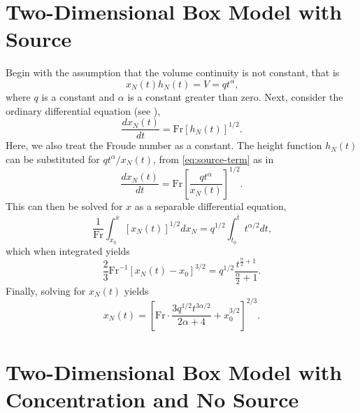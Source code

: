 	\section{Two-Dimensional Box Model with Source}
	Begin with the assumption that the volume continuity is not constant, that is 
	\begin{equation}\label{eq:source-term}
		x_N(t)h_N(t) = V = qt^{\alpha}\text{,}
	\end{equation}
	where \(q\) is a constant and \(\alpha\) is a constant greater than zero. Next, consider the ordinary differential equation (see \cite[60]{Ungarish2009}), 
	\begin{equation}\label{eq:box-model}
		\frac{dx_N(t)}{dt} = \text{Fr}\left[h_N(t)\right]^{1/2}\text{.}
	\end{equation}
	Here, we also treat the Froude number as a constant. The height function \(h_N(t)\) can be substituted for \(qt^{\alpha} / x_N(t)\), from \eqref{eq:source-term} as in
	\begin{equation*}
		\frac{dx_N(t)}{dt} = \text{Fr}\left[\frac{qt^{\alpha}}{x_N(t)}\right]^{1/2}\text{.}
	\end{equation*}
	This can then be solved for \(x\) as a separable differential equation,
	\begin{equation*}
		\frac{1}{\text{Fr}}\int_{x_0}^{\bar{x}} \left[x_N(t)\right]^{1/2} dx_N = q^{1/2} \int_{t_0}^{\bar{t}} t^{\alpha/2} dt\text{,}
	\end{equation*}
	which when integrated yields
	\begin{equation*}
		\frac{2}{3}\text{Fr}^{-1}\left[x_N(t) - x_0\right]^{3/2} = q^{1/2}\frac{t^{\frac{\alpha}{2} +1}}{\frac{\alpha}{2} + 1}\text{.}
	\end{equation*}
	Finally, solving for \(x_N(t)\) yields
	\begin{equation*}
		x_N(t) = \left[\text{Fr}\cdot\frac{3q^{1/2}t^{3\alpha/2 }}{2\alpha + 4} + x_0^{3/2}\right]^{2/3}\text{.}
	\end{equation*}

	\section{Two-Dimensional Box Model with Concentration and No Source}
	
